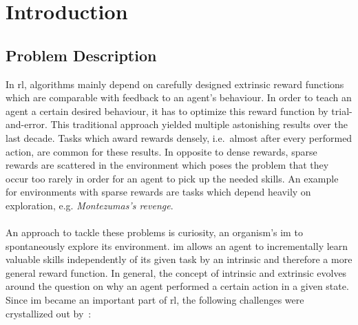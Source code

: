 \documentclass[draft,final]{vutinfth} %
\newcommand{\p}[1]{see p. #1}
\begin{document}
    \begin{kurzfassung}
    \end{kurzfassung}

    \begin{abstract}
    \end{abstract}


    \tableofcontents %

    \mainmatter


    \chapter{Introduction}



    \section{Problem Description}\label{sec:problem-description}
    In \gls{rl}, algorithms mainly depend on carefully designed extrinsic reward functions which are comparable with feedback to an agent's behaviour.
    In order to teach an agent a certain desired behaviour, it has to optimize this reward function by trial-and-error.
    This traditional approach yielded multiple astonishing results over the last decade.
    Tasks which award rewards densely, i.e.\ almost after every performed action, are common for these results.
    In opposite to dense rewards, sparse rewards are scattered in the environment which poses the problem that they occur too rarely in order for an agent to pick up the needed skills.
    An example for environments with sparse rewards are tasks which depend heavily on exploration, e.g. \textit{Montezumas's revenge}.
    \\\\
    An approach to tackle these problems is curiosity, an organism's \gls{im} to spontaneously explore its environment.
    \gls{im} allows an agent to incrementally learn valuable skills independently of its given task by an intrinsic and therefore a more general reward function.
    In general, the concept of intrinsic and extrinsic evolves around the question on why an agent performed a certain action in a given state.
    Since \gls{im} became an important part of \gls{rl}, the following challenges were crystallized out by~\cite[\p{6}]{aubret_survey_2019}:
\end{document}

